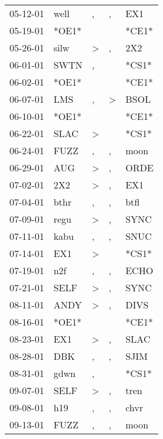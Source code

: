 \begin{supertabular}{lllll}
 05-12-01 &   well &             , &                , &    EX1 \\
 05-19-01 &  *OE1* &               &                  &  *CE1* \\
 05-26-01 &   silw &  \textgreater &                , &    2X2 \\
 06-01-01 &   SWTN &             , &                  &  *CS1* \\
 06-02-01 &  *OE1* &               &                  &  *CE1* \\
 06-07-01 &    LMS &             , &     \textgreater &   BSOL \\
 06-10-01 &  *OE1* &               &                  &  *CE1* \\
 06-22-01 &   SLAC &  \textgreater &                  &  *CS1* \\
 06-24-01 &   FUZZ &             , &                , &   moon \\
 06-29-01 &    AUG &  \textgreater &                , &   ORDE \\
 07-02-01 &    2X2 &  \textgreater &                , &    EX1 \\
 07-04-01 &   bthr &             , &                , &   btfl \\
 07-09-01 &   regu &  \textgreater &                , &   SYNC \\
 07-11-01 &   kabu &             , &                , &   SNUC \\
 07-14-01 &    EX1 &  \textgreater &                  &  *CS1* \\
 07-19-01 &    n2f &             , &                , &   ECHO \\
 07-21-01 &   SELF &  \textgreater &                , &   SYNC \\
 08-11-01 &   ANDY &  \textgreater &                , &   DIVS \\
 08-16-01 &  *OE1* &               &                  &  *CE1* \\
 08-23-01 &    EX1 &  \textgreater &                , &   SLAC \\
 08-28-01 &    DBK &             , &                , &   SJIM \\
 08-31-01 &   gdwn &             , &                  &  *CS1* \\
 09-07-01 &   SELF &  \textgreater &                , &   tren \\
 09-08-01 &    h19 &             , &                , &   chvr \\
 09-13-01 &   FUZZ &             , &                , &   moon \\

\end{supertabular}
